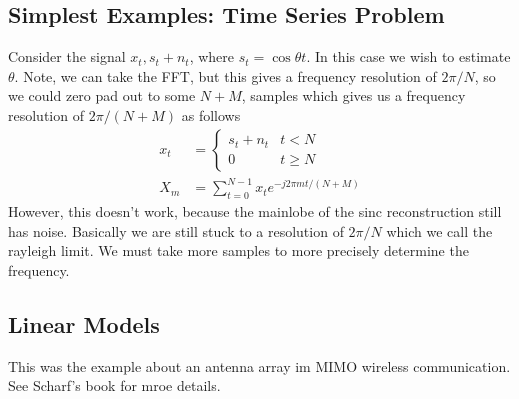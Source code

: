 \documentclass[a4paper]{article}
\begin{document}
\subsection*{Simplest Examples: Time Series Problem}%
\label{sub:Simplest Examples: Time Series Problem}
Consider the signal $x_t, s_t + n_t$, where $s_t = \cos \theta t$. In this case we wish to estimate $\theta$. Note, we can take the FFT, but this gives a frequency resolution of $2\pi/N$, so we could zero pad out to some $N + M$, samples which gives us a frequency resolution of $2 \pi/(N + M)$ as follows
\[
  \begin{aligned}
    x_t &=
    \begin{cases}
      s_t + n_t & t < N \\
      0 & t \geq N
    \end{cases} \\
  X_m &= \sum_{t=0}^{N-1} x_t e^{-j2\pi mt/(N+M)}
  \end{aligned}
\]
However, this doesn't work, because the mainlobe of the sinc reconstruction still has noise. Basically we are still stuck to a resolution of $2\pi/N$ which we call the rayleigh limit. We must take more samples to more precisely determine the frequency.

\subsection*{Linear Models}%
\label{sub:Linear Models}
This was the example about an antenna array im MIMO wireless communication. See Scharf's book for mroe details.
\end{document}
